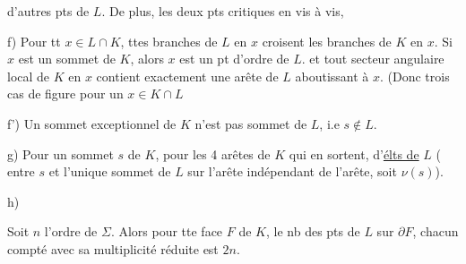 
d'autres pts de $L$. De plus, les  deux pts critiques en vis à vis,

f) Pour tt $x\in L\cap K$, ttes branches de $L$ en $x$ croisent les branches de $K$ en $x$. Si $x$ est un sommet de $K$, alors $x$ est un pt d'ordre  de $L$. et tout secteur angulaire local de $K$ en $x$    contient exactement une arête de $L$ aboutissant à $x$. (Donc trois cas de figure pour un $x\in K\cap L$

f') Un sommet exceptionnel  de $K$ n'est pas sommet de $L$, i.e $s\notin L$.

g)  Pour un sommet  $s$ de $K$, pour les 4 arêtes  de $K$ qui en sortent,  d'\uline{élts de} $L$ ( entre $s$ et l'unique sommet de $L$ sur l'arête  indépendant de l'arête, soit $\nu(s)$).

\deleted{Soit $\varepsilon(s)=\left[\begin{array}{ll}+1&\text{si }s\in L\\0&\text{si }s\notin L\end{array}\right.$}


h) 

Soit $n$ l'ordre de $\Sigma$. Alors pour tte face $F$ de $K$, le nb des pts de $L$ sur $\partial F$, chacun compté avec sa multiplicité réduite est $2n$.


